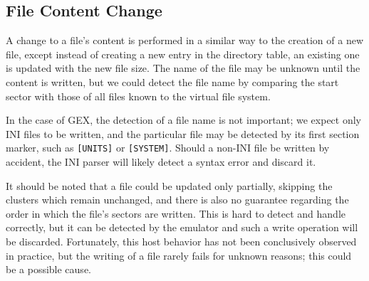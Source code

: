 \subsection{File Content Change}

A change to a file's content is performed in a similar way to the creation of a new file, except instead of creating a new entry in the directory table, an existing one is updated with the new file size. The name of the file may be unknown until the content is written, but we could detect the file name by comparing the start sector with those of all files known to the virtual file system.

In the case of GEX, the detection of a file name is not important; we expect only INI files to be written, and the particular file may be detected by its first section marker, such as \verb|[UNITS]| or \verb|[SYSTEM]|. Should a non-INI file be written by accident, the INI parser will likely detect a syntax error and discard it.

It should be noted that a file could be updated only partially, skipping the clusters which remain unchanged, and there is also no guarantee regarding the order in which the file's sectors are written. This is hard to detect and handle correctly, but it can be detected by the emulator and such a write operation will be discarded. Fortunately, this host behavior has not been conclusively observed in practice, but the writing of a file rarely fails for unknown reasons; this could be a possible cause.













